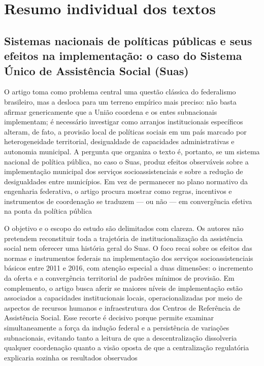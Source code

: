 \documentclass[12pt,a4paper]{article}
\begin{document}
\section{Resumo individual dos textos}
\label{sec:org42c6cc6}



\subsection{Sistemas nacionais de políticas públicas e seus efeitos na implementação: o caso do Sistema Único de Assistência Social (Suas)}
\label{sec:org850e4f1}

O artigo toma como problema central uma questão clássica do federalismo brasileiro, mas a desloca para um terreno empírico mais preciso: não basta afirmar genericamente que a União coordena e os entes subnacionais implementam; é necessário investigar como arranjos institucionais específicos alteram, de fato, a provisão local de políticas sociais em um país marcado por heterogeneidade territorial, desigualdade de capacidades administrativas e autonomia municipal. A pergunta que organiza o texto é, portanto, se um sistema nacional de política pública, no caso o Suas, produz efeitos observáveis sobre a implementação municipal dos serviços socioassistenciais e sobre a redução de desigualdades entre municípios. Em vez de permanecer no plano normativo da engenharia federativa, o artigo procura mostrar como regras, incentivos e instrumentos de coordenação se traduzem — ou não — em convergência efetiva na ponta da política pública\parencite{bichir2020_sistemas_nacionais}

O objetivo e o escopo do estudo são delimitados com clareza. Os autores não pretendem reconstituir toda a trajetória de institucionalização da assistência social nem oferecer uma história geral do Suas. O foco recai sobre os efeitos das normas e instrumentos federais na implementação dos serviços socioassistenciais básicos entre 2011 e 2016, com atenção especial a duas dimensões: o incremento da oferta e a convergência territorial de padrões mínimos de provisão. Em complemento, o artigo busca aferir se maiores níveis de implementação estão associados a capacidades institucionais locais, operacionalizadas por meio de aspectos de recursos humanos e infraestrutura dos Centros de Referência de Assistência Social. Esse recorte é decisivo porque permite examinar simultaneamente a força da indução federal e a persistência de variações subnacionais, evitando tanto a leitura de que a descentralização dissolveria qualquer coordenação quanto a visão oposta de que a centralização regulatória explicaria sozinha os resultados observados\parencite{bichir2020_sistemas_nacionais}
\end{document}
